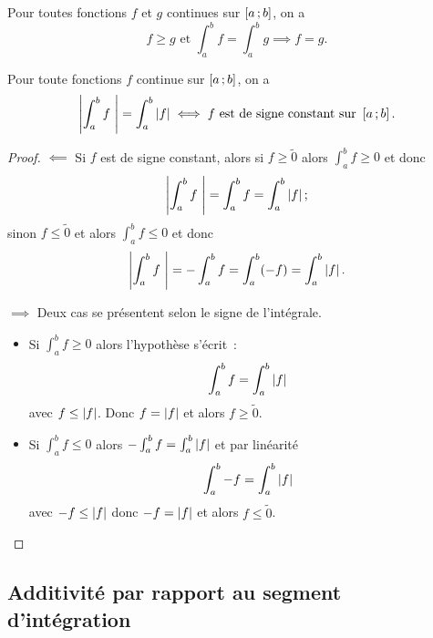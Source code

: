 \begin{corth}
  Pour toutes fonctions $f$ et $g$ continues sur $\left[ a \, ;  b \right]$, on a
  \begin{equation}
    f \geq g \text{~et~} \int_a^b f = \int_a^b g  \implies f = g.
  \end{equation} 
\end{corth}

\begin{theo}
  Pour toute fonctions $f$ continue sur $\left[ a \, ;  b \right]$, on a
  \begin{equation}
    \left\lvert\int_a^b f~\right\rvert = \int_a^b \left\lvert f\right\rvert \iff f \text{~est de signe constant sur~} \left[ a \, ;  b \right].
  \end{equation}
\end{theo}
\begin{proof}
  $\impliedby$ Si $f$ est de signe constant, alors si $f \geq \tilde{0}$ alors $\int_a^b f \geq 0$ et donc
  \begin{equation}
     \left\lvert\int_a^b f~\right\rvert = \int_a^b f = \int_a^b \left\lvert f\right\rvert;
  \end{equation}
  sinon $f \leq \tilde{0}$ et alors $\int_a^b f \leq 0$ et donc
  \begin{equation}
    \left\lvert\int_a^b f~\right\rvert = -\int_a^b f = \int_a^b (-f) = \int_a^b \left\lvert f\right\rvert.
  \end{equation}

  $\implies$ Deux cas se présentent selon le signe de l'intégrale.
  \begin{itemize}
  \item Si $\int_a^b f \geq 0$ alors l'hypothèse s'écrit~:
    \begin{equation}
      \int_a^b f = \int_a^b \left\lvert f\right\rvert
    \end{equation}
    avec $f \leq \left\lvert f\right\rvert$. Donc $f=\left\lvert f\right\rvert$ et alors $f \geq \tilde{0}$.
  \item Si $\int_a^b f \leq 0$ alors $-\int_a^b f = \int_a^b \left\lvert f\right\rvert$ et par linéarité
    \begin{equation}
      \int_a^b -f = \int_a^b \left\lvert f\right\rvert
    \end{equation}
    avec $-f \leq \left\lvert f\right\rvert$ donc $-f=\left\lvert f\right\rvert$ et alors $f \leq \tilde{0}$.
  \end{itemize}
\end{proof}

\subsection{Additivité par rapport au segment d'intégration}

